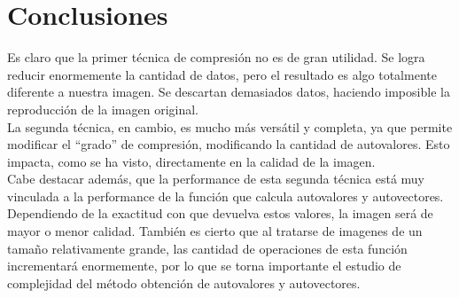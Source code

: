 \documentclass[twocolumn,a4paper,10pt]{article}
\begin{document}


\section{Conclusiones}

Es claro que la primer t\'ecnica de compresi\'on no es de gran utilidad. Se logra reducir enormemente la cantidad de datos, pero el resultado es algo
totalmente diferente a nuestra imagen. Se descartan demasiados datos, haciendo imposible la reproducci\'on de la imagen original.\\

La segunda t\'ecnica, en cambio, es mucho m\'as vers\'atil y completa, ya que permite modificar el ``grado'' de compresi\'on, modificando la cantidad de 
autovalores. Esto impacta, como se ha visto, directamente en la calidad de la imagen.\\

Cabe destacar adem\'as, que la performance de esta segunda t\'ecnica est\'a muy vinculada a la performance de la funci\'on que calcula autovalores y autovectores.
Dependiendo de la exactitud con que devuelva estos valores, la imagen ser\'a de mayor o menor calidad. Tambi\'en es cierto que al tratarse de imagenes de un tamaño 
relativamente grande, las cantidad de operaciones de esta funci\'on incrementar\'a enormemente, por lo que se torna importante el estudio de complejidad del 
m\'etodo obtenci\'on de autovalores y autovectores.\\ 
\end{document}
